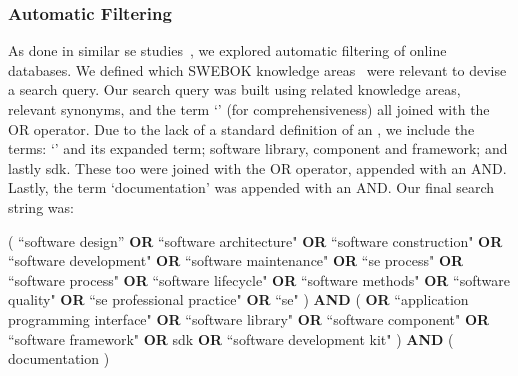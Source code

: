 
\subsubsection{Automatic Filtering}

As done in similar \gls{se} studies~\citep{Glass:2002wa,Usman:2017hn,GAROUSI2019101}, we explored  automatic filtering of online databases. We defined which SWEBOK  knowledge areas~\citep{IEEE:1990wp} were relevant to devise a search query. Our search query was built using related knowledge areas, relevant synonyms, and the term `' (for comprehensiveness) all joined with the OR operator. Due to the lack of a standard definition of an , we include the terms: `' and its expanded term; software library, component and framework; and lastly \gls{sdk}. These too were joined with the OR operator, appended with an AND. Lastly, the term `documentation' was appended with an AND.
Our final search string was:
\begin{framed}
\noindent
\parbox{\linewidth}{
\scriptsize
( ``software design'' \textbf{OR} ``software architecture" \textbf{OR} ``software construction" \textbf{OR} ``software development" \textbf{OR} ``software maintenance" \textbf{OR} ``\gls{se} process" \textbf{OR} ``software process" \textbf{OR} ``software lifecycle" \textbf{OR} ``software methods" \textbf{OR} ``software quality" \textbf{OR} ``\gls{se} professional practice" \textbf{OR} ``\gls{se}" ) \textbf{AND} (  \textbf{OR} ``application programming interface" \textbf{OR} ``software library" \textbf{OR} ``software component" \textbf{OR} ``software framework" \textbf{OR} sdk \textbf{OR} ``software development kit" ) \textbf{AND} ( documentation )
}
\end{framed}

